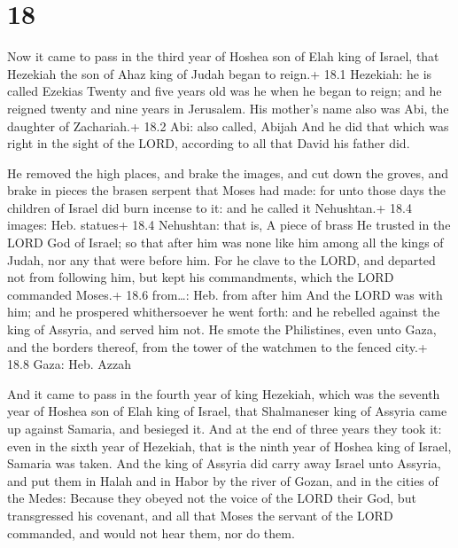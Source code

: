 \hypertarget{section-17}{%
\section{18}\label{section-17}}

 Now it came to pass in the third year of Hoshea son of Elah
king of Israel, that Hezekiah the son of Ahaz king of Judah began to
reign.+ 18.1 Hezekiah: he is called Ezekias  Twenty and five
years old was he when he began to reign; and he reigned twenty and nine
years in Jerusalem. His mother's name also was Abi, the daughter of
Zachariah.+ 18.2 Abi: also called, Abijah  And he did that
which was right in the sight of the LORD, according to all that David
his father did.

 He removed the high places, and brake the images, and cut
down the groves, and brake in pieces the brasen serpent that Moses had
made: for unto those days the children of Israel did burn incense to it:
and he called it Nehushtan.+ 18.4 images: Heb. statues+ 18.4 Nehushtan:
that is, A piece of brass  He trusted in the LORD God of
Israel; so that after him was none like him among all the kings of
Judah, nor any that were before him.  For he clave to the
LORD, and departed not from following him, but kept his commandments,
which the LORD commanded Moses.+ 18.6 from\ldots: Heb. from after him
 And the LORD was with him; and he prospered whithersoever
he went forth: and he rebelled against the king of Assyria, and served
him not.  He smote the Philistines, even unto Gaza, and the
borders thereof, from the tower of the watchmen to the fenced city.+
18.8 Gaza: Heb. Azzah

 And it came to pass in the fourth year of king Hezekiah,
which was the seventh year of Hoshea son of Elah king of Israel, that
Shalmaneser king of Assyria came up against Samaria, and besieged it.
 And at the end of three years they took it: even in the
sixth year of Hezekiah, that is the ninth year of Hoshea king of Israel,
Samaria was taken.  And the king of Assyria did carry away
Israel unto Assyria, and put them in Halah and in Habor by the river of
Gozan, and in the cities of the Medes:  Because they obeyed
not the voice of the LORD their God, but transgressed his covenant, and
all that Moses the servant of the LORD commanded, and would not hear
them, nor do them.

